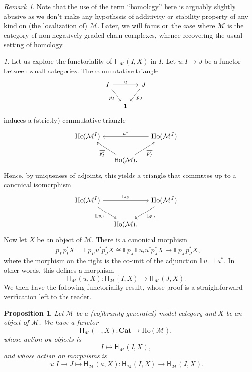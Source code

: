\documentclass[reqno]{amsart}
\theoremstyle{plain}
\newtheorem{proposition}[subsubsection]{Proposition}
\theoremstyle{definition}
\theoremstyle{remark}
\newtheorem{remark}[subsubsection]{Remark}
\newtheorem{paragr}[subsubsection]{} %
\newcommand{\M}{\mathcal{M}}
\newcommand{\fun}[2]{{#2}^{#1}} %
\newcommand{\ctg}[1]{\mathbf{#1}}  %
\newcommand{\Cat}{\ctg{Cat}}   %
\newcommand{\Term}{\ctg{1}} %
\newcommand{\functor}[1]{\mathsf{#1}} %
\newcommand{\Ho}{\functor{H}} %
\newcommand{\LL}{\mathbb{L}} %
\newcommand{\Loc}[1]{\mathrm{Ho}(#1)} %
\newcommand{\GZ}[1]{\overline{#1}} %
\begin{document}
\begin{remark}
  Note that the use of the term ``homology'' here is arguably slightly
  abusive as we don't make any hypothesis of additivity or stability
  property of any kind on (the localization of) $\M$. Later, we will
  focus on the case where $\M$ is the category of non-negatively
  graded chain complexes, whence recovering the usual setting of homology.
\end{remark}
\begin{paragr}
 Let us explore the functoriality of $\Ho_{\M}(I,X)$ in $I$. Let
  $u \colon I \to J$ be a functor between small categories. The
  commutative triangle
  \[
    \begin{tikzcd}[column sep=small]
      I \ar[rr,"u"]\ar[rd,"p_I"'] && J\ar[ld,"p_J"] \\
      &\Term&
    \end{tikzcd}
  \]
  induces a (strictly) commutative triangle
  \[
    \begin{tikzcd}[column sep=small]
      \Loc{\fun{I}{\M}}  && \Loc{\fun{J}{\M}}\ar[ll,"\GZ{u^*}"'] \\
      &\Loc{\M}.\ar[lu,"\GZ{p_I^*}"]\ar[ru,"\GZ{p_J^*}"']&
    \end{tikzcd}
  \]
  Hence, by uniqueness of adjoints, this yields a triangle that commutes
  up to a canonical isomorphism
  \[
        \begin{tikzcd}[column sep=small]
      \Loc{\fun{I}{\M}} \ar[rr,"\LL u_!"]\ar[rd,"\LL p_{I!}"'] &&
      \Loc{\fun{J}{\M}}\ar[ld,"\LL p_{J!}"] \\
      &\Loc{\M}.&
    \end{tikzcd}
  \]
  Now let $X$ be an object of $\M$. There is a canonical morphism
  \[
    \LL p_{I!}\GZ{p_I^*}X =\LL p_{I!}\GZ{u^*p_J^*}X \cong \LL p_{J!} \LL u_! \GZ{u^*p_J^*}X\to \LL p_{J!}\GZ{p_J^*}X,
  \]
  where the morphism on the right is the co-unit of the adjunction
  $\LL u_! \dashv \GZ{u^*}$. In other words, this defines a morphism
  \[
  \Ho_{\M}(u,X)\colon  \Ho_{\M}(I,X)\to \Ho_{\M}(J,X).
  \]
  We then have the following functoriality result, whose proof is a
  straightforward verification left to the reader.
\end{paragr}
\begin{proposition}\label{prop:functorialityhomology}
  Let $\M$ be a (cofibrantly generated) model category and $X$ be an
  object of $\M$. We have a functor
  \[
    \Ho_{\M}(-,X) \colon \Cat \to \Loc{\M},
  \]
  whose action on objects is
  \[
    I \longmapsto \Ho_{\M}(I,X),
  \]
  and whose action on morphisms is
  \[
    u \colon I \to J \longmapsto \Ho_{\M}(u,X) \colon
    \Ho_{\M}(I,X) \to \Ho_{\M}(J,X).
  \]
\end{proposition}
\end{document}
